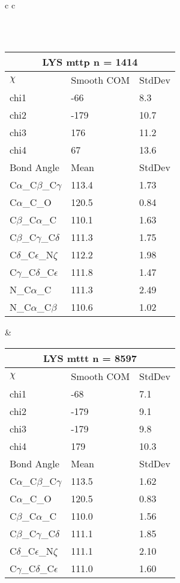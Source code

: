 \begin{longtable}{ c c }
\begin{tabular}{ l l l }
  \bottomrule
  \end{tabular}
  \\
  \begin{tabular}{ l l l }
  \toprule
  \multicolumn{3}{c}{LYS \textbf{mttp} n = 1414} \\ \toprule
  $\chi$       & Smooth COM & StdDev \\ \midrule
  chi1 & -66 & 8.3 \\ 
  chi2 & -179 & 10.7 \\ 
  chi3 & 176 & 11.2 \\ 
  chi4 & 67 & 13.6 \\ \midrule
  Bond Angle   & Mean     & StdDev \\ \midrule
  C$\alpha$\_C$\beta$\_C$\gamma$ & 113.4 & 1.73\\
  C$\alpha$\_C\_O & 120.5 & 0.84\\
  C$\beta$\_C$\alpha$\_C & 110.1 & 1.63\\
  C$\beta$\_C$\gamma$\_C$\delta$ & 111.3 & 1.75\\
  C$\delta$\_C$\epsilon$\_N$\zeta$ & 112.2 & 1.98\\
  C$\gamma$\_C$\delta$\_C$\epsilon$ & 111.8 & 1.47\\
  N\_C$\alpha$\_C & 111.3 & 2.49\\
  N\_C$\alpha$\_C$\beta$ & 110.6 & 1.02\\
  \bottomrule
  \end{tabular}
  &
  \begin{tabular}{ l l l }
  \toprule
  \multicolumn{3}{c}{LYS \textbf{mttt} n = 8597} \\ \toprule
  $\chi$       & Smooth COM & StdDev \\ \midrule
  chi1 & -68 & 7.1 \\ 
  chi2 & -179 & 9.1 \\ 
  chi3 & -179 & 9.8 \\ 
  chi4 & 179 & 10.3 \\ \midrule
  Bond Angle   & Mean     & StdDev \\ \midrule
  C$\alpha$\_C$\beta$\_C$\gamma$ & 113.5 & 1.62\\
  C$\alpha$\_C\_O & 120.5 & 0.83\\
  C$\beta$\_C$\alpha$\_C & 110.0 & 1.56\\
  C$\beta$\_C$\gamma$\_C$\delta$ & 111.1 & 1.85\\
  C$\delta$\_C$\epsilon$\_N$\zeta$ & 111.1 & 2.10\\
  C$\gamma$\_C$\delta$\_C$\epsilon$ & 111.0 & 1.60\\

\end{tabular}
\end{longtable}
